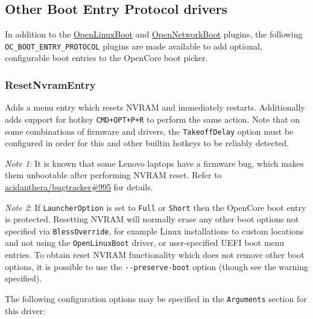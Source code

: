 \documentclass[]{article}
\begin{document}
\subsection{Other Boot Entry Protocol drivers}

In addition to the \hyperref[uefilinux]{OpenLinuxBoot} and \hyperref[uefinetboot]{OpenNetworkBoot} plugins,
the following \texttt{OC\_BOOT\_ENTRY\_PROTOCOL}
plugins are made available to add optional, configurable boot entries to the OpenCore boot picker.

\subsubsection{ResetNvramEntry}\label{uefiresetnvram}

Adds a menu entry which resets NVRAM and immediately restarts. Additionally adds support for hotkey
\texttt{CMD+OPT+P+R} to perform the same action. Note that on some combinations of firmware and
drivers, the \texttt{TakeoffDelay} option must be configured in order for this
and other builtin hotkeys to be reliably detected.

\emph{Note 1}: It is known that some Lenovo laptops have a firmware
bug, which makes them unbootable after performing NVRAM reset. Refer to
\href{https://github.com/acidanthera/bugtracker/issues/995}{acidanthera/bugtracker\#995}
for details.

\emph{Note 2}: If \texttt{LauncherOption} is set to \texttt{Full} or \texttt{Short} then the
OpenCore boot entry is protected. Resetting NVRAM will normally erase any other boot options
not specified via \texttt{BlessOverride}, for example Linux installations to custom locations
and not using the \texttt{OpenLinuxBoot} driver, or user-specified UEFI boot menu entries.
To obtain reset NVRAM functionality which does not remove other boot options, it is possible
to use the \texttt{-{}-preserve-boot} option (though see the warning specified).

The following configuration options may be specified in the \texttt{Arguments} section for this driver:
\end{document}
